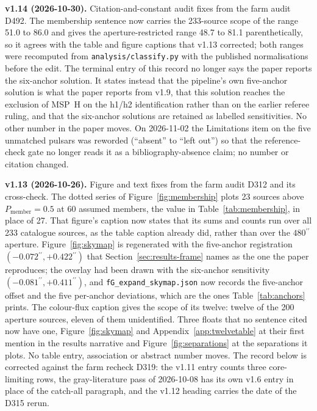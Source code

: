 \documentclass[11pt]{article}
\newcommand{\as}{\ensuremath{^{\prime\prime}}}
\begin{document}
\textbf{v1.14 (2026-10-30).} Citation-and-constant audit fixes from the farm audit D492. The membership sentence now carries the 233-source scope of the range 51.0 to 86.0 and gives the aperture-restricted range 48.7 to 81.1 parenthetically, so it agrees with the table and figure captions that v1.13 corrected; both ranges were recomputed from \texttt{analysis/classify.py} with the published normalisations before the edit. The terminal entry of this record no longer says the paper reports the six-anchor solution. It states instead that the pipeline's own five-anchor solution is what the paper reports from v1.9, that this solution reaches the exclusion of MSP~H on the h1/h2 identification rather than on the earlier referee ruling, and that the six-anchor solutions are retained as labelled sensitivities. No other number in the paper moves. On 2026-11-02 the Limitations item on the five unmatched pulsars was reworded (``absent'' to ``left out'') so that the reference-check gate no longer reads it as a bibliography-absence claim; no number or citation changed.

\textbf{v1.13 (2026-10-26).} Figure and text fixes from the farm audit D312 and its cross-check. The dotted series of Figure~\ref{fig:membership} plots 23 sources above $P_{\mathrm{member}} = 0.5$ at 60 assumed members, the value in Table~\ref{tab:membership}, in place of 27. That figure's caption now states that its sums and counts run over all 233 catalogue sources, as the table caption already did, rather than over the $480\as$ aperture. Figure~\ref{fig:skymap} is regenerated with the five-anchor registration $(-0.072\as, +0.422\as)$ that Section~\ref{sec:results-frame} names as the one the paper reproduces; the overlay had been drawn with the six-anchor sensitivity $(-0.081\as, +0.411\as)$, and \texttt{fG\_expand\_skymap.json} now records the five-anchor offset and the five per-anchor deviations, which are the ones Table~\ref{tab:anchors} prints. The colour-flux caption gives the scope of its twelve: twelve of the 200 aperture sources, eleven of them unidentified. Three floats that no sentence cited now have one, Figure~\ref{fig:skymap} and Appendix~\ref{app:twelvetable} at their first mention in the results narrative and Figure~\ref{fig:separations} at the separations it plots. No table entry, association or abstract number moves. The record below is corrected against the farm recheck D319: the v1.11 entry counts three core-limiting rows, the gray-literature pass of 2026-10-08 has its own v1.6 entry in place of the catch-all paragraph, and the v1.12 heading carries the date of the D315 rerun.
\end{document}
